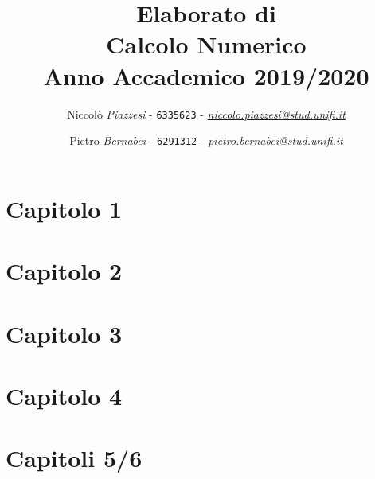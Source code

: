 \documentclass[a4paper]{article}
\date{}
\begin{document}
\title{\vspace{2cm}Elaborato di\\ \textbf{Calcolo Numerico}\\ Anno Accademico 2019/2020\vspace{3cm}}

\author{Niccolò \emph{Piazzesi} - \texttt{6335623} - \href{mailto:niccolo.piazzesi@stud.unifi.it}{\textit{niccolo.piazzesi@stud.unifi.it}}
   \and Pietro \emph{Bernabei} - \texttt{6291312} - \textit{pietro.bernabei@stud.unifi.it}}


\maketitle
\newpage
\tableofcontents


\newpage
\section{\textbf{Capitolo 1}}


\newpage
\section{\textbf{Capitolo 2}}


\newpage
\section{\textbf{Capitolo 3}}


\newpage
\section{\textbf{Capitolo 4}}


\newpage
\section{\textbf{Capitoli 5/6}}

\newpage
{}
\end{document}
